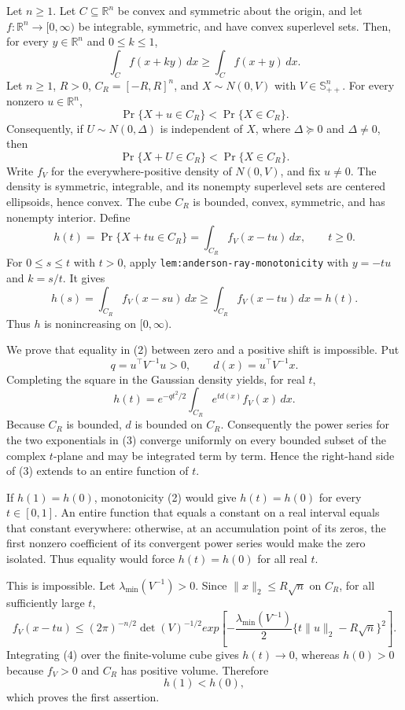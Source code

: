Let \(n\geq1\).  Let \(C\subseteq\mathbb R^n\) be convex and symmetric about the origin, and let \(f:\mathbb R^n\to[0,\infty)\) be integrable, symmetric, and have convex superlevel sets.  Then, for every \(y\in\mathbb R^n\) and \(0\leq k\leq1\),
\[
 \int_C f(x+ky)\,dx\geq \int_C f(x+y)\,dx.
\]
Let \(n\geq1\), \(R>0\), \(C_R=[-R,R]^n\), and \(X\sim N(0,V)\) with \(V\in\mathbb S_{++}^n\).  For every nonzero \(u\in\mathbb R^n\),
\[
 \Pr\{X+u\in C_R\}<\Pr\{X\in C_R\}.
\]
Consequently, if \(U\sim N(0,\Delta)\) is independent of \(X\), where \(\Delta\succeq0\) and \(\Delta\ne0\), then
\[
 \Pr\{X+U\in C_R\}<\Pr\{X\in C_R\}.
\]
Write \(f_V\) for the everywhere-positive density of \(N(0,V)\), and fix
\(u\ne0\).  The density is symmetric, integrable, and its nonempty
superlevel sets are centered ellipsoids, hence convex.  The cube \(C_R\) is
bounded, convex, symmetric, and has nonempty interior.  Define
\[
 h(t)=\Pr\{X+tu\in C_R\}
     =\int_{C_R}f_V(x-tu)\,dx,
 \qquad t\geq0. \tag{1}
\]
For \(0\leq s\leq t\) with \(t>0\), apply
\texttt{lem:anderson-ray-monotonicity} with \(y=-tu\) and \(k=s/t\).
It gives
\[
 h(s)=\int_{C_R}f_V(x-su)\,dx
 \geq\int_{C_R}f_V(x-tu)\,dx=h(t). \tag{2}
\]
Thus \(h\) is nonincreasing on \([0,\infty)\).

We prove that equality in (2) between zero and a positive shift is
impossible.  Put
\[
 q=u^{\top}V^{-1}u>0,
 \qquad d(x)=u^{\top}V^{-1}x.
\]
Completing the square in the Gaussian density yields, for real \(t\),
\[
 h(t)=e^{-qt^2/2}\int_{C_R}e^{t d(x)}f_V(x)\,dx. \tag{3}
\]
Because \(C_R\) is bounded, \(d\) is bounded on \(C_R\).  Consequently the
power series for the two exponentials in (3) converge uniformly on every
bounded subset of the complex \(t\)-plane and may be integrated term by
term.  Hence the right-hand side of (3) extends to an entire function of
\(t\).

If \(h(1)=h(0)\), monotonicity (2) would give \(h(t)=h(0)\) for every
\(t\in[0,1]\).  An entire function that equals a constant on a real interval
equals that constant everywhere: otherwise, at an accumulation point of its
zeros, the first nonzero coefficient of its convergent power series would
make the zero isolated.  Thus equality would force \(h(t)=h(0)\) for all
real \(t\).

This is impossible.  Let \(\lambda_{\min}(V^{-1})>0\).  Since
\(\lVert x\rVert_2\leq R\sqrt n\) on \(C_R\), for all sufficiently large
\(t\),
\[
 f_V(x-tu)
 \leq (2\pi)^{-n/2}\det(V)^{-1/2}
 exp\!\left[-\frac{\lambda_{\min}(V^{-1})}{2}
       \{t\lVert u\rVert_2-R\sqrt n\}^2\right]. \tag{4}
\]
Integrating (4) over the finite-volume cube gives \(h(t)\to0\), whereas
\(h(0)>0\) because \(f_V>0\) and \(C_R\) has positive volume.  Therefore
\[
 h(1)<h(0), \tag{5}
\]
which proves the first assertion.

